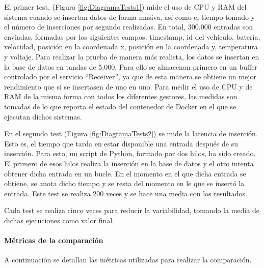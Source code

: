 
El primer test, (Figura \ref{fig:DiagramaTests1}) mide el uso de CPU y RAM del sistema cuando se insertan datos de forma
masiva, así como el tiempo tomado y el número de inserciones por segundo realizadas. En total, 300.000 entradas son enviadas,
formadas por los siguientes campos: timestamp, id del vehículo, batería, velocidad, posición en la coordenada x, posición
en la coordenada y, temperatura y voltaje. Para realizar la prueba de manera más realista, los datos se insertan en la
base de datos en tandas de 5.000. Para ello se almacenan primero en un buffer controlado por el servicio ``Receiver'', ya
que de esta manera se obtiene un mejor rendimiento que si se insertasen de uno en uno. Para medir el uso de CPU y de RAM
de la misma forma con todos los diferentes gestores, las medidas son tomadas de lo que reporta el estado del contenedor
de Docker en el que se ejecutan dichos sistemas.

En el segundo test (Figura \ref*{fig:DiagramaTests2}) se mide la latencia de inserción. Esto es, el tiempo que tarda
en estar disponible una entrada después de su inserción. Para esto, un script de Python, formado por dos hilos, ha sido creado.
El primero de esos hilos realiza la inserción en la base de datos y el otro intenta obtener dicha entrada en un bucle.
En el momento en el que dicha entrada se obtiene, se anota dicho tiempo y se resta del momento en le que se insertó
la entrada. Este test se realiza 200 veces y se hace una media con los resultados.

Cada test se realiza cinco veces para reducir la variabilidad, tomando la media de dichas ejecuciones como valor final.

\paragraph*{Métricas de la comparación} 
A continuación se detallan las métricas utilizadas para realizar la comparación.


